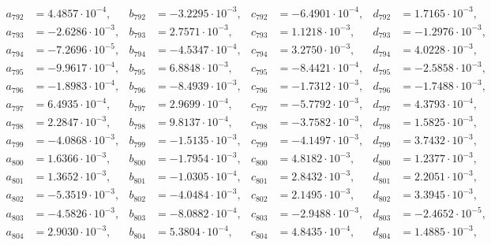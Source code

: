 \begin{align*}
  a_{ 792 } &= 4.4857 \cdot 10^{ -4 }, & b_{ 792 } &= -3.2295 \cdot 10^{ -3 }, & c_{ 792 } &= -6.4901 \cdot 10^{ -4 }, & d_{ 792 } &= 1.7165 \cdot 10^{ -3 }, \\ 
  a_{ 793 } &= -2.6286 \cdot 10^{ -3 }, & b_{ 793 } &= 2.7571 \cdot 10^{ -3 }, & c_{ 793 } &= 1.1218 \cdot 10^{ -3 }, & d_{ 793 } &= -1.2976 \cdot 10^{ -3 }, \\ 
  a_{ 794 } &= -7.2696 \cdot 10^{ -5 }, & b_{ 794 } &= -4.5347 \cdot 10^{ -4 }, & c_{ 794 } &= 3.2750 \cdot 10^{ -3 }, & d_{ 794 } &= 4.0228 \cdot 10^{ -3 }, \\ 
  a_{ 795 } &= -9.9617 \cdot 10^{ -4 }, & b_{ 795 } &= 6.8848 \cdot 10^{ -3 }, & c_{ 795 } &= -8.4421 \cdot 10^{ -4 }, & d_{ 795 } &= -2.5858 \cdot 10^{ -3 }, \\ 
  a_{ 796 } &= -1.8983 \cdot 10^{ -4 }, & b_{ 796 } &= -8.4939 \cdot 10^{ -3 }, & c_{ 796 } &= -1.7312 \cdot 10^{ -3 }, & d_{ 796 } &= -1.7488 \cdot 10^{ -3 }, \\ 
  a_{ 797 } &= 6.4935 \cdot 10^{ -4 }, & b_{ 797 } &= 2.9699 \cdot 10^{ -4 }, & c_{ 797 } &= -5.7792 \cdot 10^{ -3 }, & d_{ 797 } &= 4.3793 \cdot 10^{ -4 }, \\ 
  a_{ 798 } &= 2.2847 \cdot 10^{ -3 }, & b_{ 798 } &= 9.8137 \cdot 10^{ -4 }, & c_{ 798 } &= -3.7582 \cdot 10^{ -3 }, & d_{ 798 } &= 1.5825 \cdot 10^{ -3 }, \\ 
  a_{ 799 } &= -4.0868 \cdot 10^{ -3 }, & b_{ 799 } &= -1.5135 \cdot 10^{ -3 }, & c_{ 799 } &= -4.1497 \cdot 10^{ -3 }, & d_{ 799 } &= 3.7432 \cdot 10^{ -3 }, \\ 
  a_{ 800 } &= 1.6366 \cdot 10^{ -3 }, & b_{ 800 } &= -1.7954 \cdot 10^{ -3 }, & c_{ 800 } &= 4.8182 \cdot 10^{ -3 }, & d_{ 800 } &= 1.2377 \cdot 10^{ -3 }, \\ 
  a_{ 801 } &= 1.3652 \cdot 10^{ -3 }, & b_{ 801 } &= -1.0305 \cdot 10^{ -4 }, & c_{ 801 } &= 2.8432 \cdot 10^{ -3 }, & d_{ 801 } &= 2.2051 \cdot 10^{ -3 }, \\ 
  a_{ 802 } &= -5.3519 \cdot 10^{ -3 }, & b_{ 802 } &= -4.0484 \cdot 10^{ -3 }, & c_{ 802 } &= 2.1495 \cdot 10^{ -3 }, & d_{ 802 } &= 3.3945 \cdot 10^{ -3 }, \\ 
  a_{ 803 } &= -4.5826 \cdot 10^{ -3 }, & b_{ 803 } &= -8.0882 \cdot 10^{ -4 }, & c_{ 803 } &= -2.9488 \cdot 10^{ -3 }, & d_{ 803 } &= -2.4652 \cdot 10^{ -5 }, \\ 
  a_{ 804 } &= 2.9030 \cdot 10^{ -3 }, & b_{ 804 } &= 5.3804 \cdot 10^{ -4 }, & c_{ 804 } &= 4.8435 \cdot 10^{ -4 }, & d_{ 804 } &= 1.4885 \cdot 10^{ -3 }, \\ 

\end{align*}
